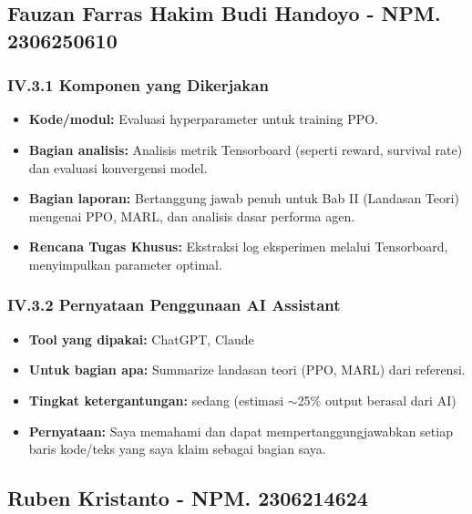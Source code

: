 \documentclass[12pt,a4paper]{article}
\begin{document}
\subsection{Fauzan Farras Hakim Budi Handoyo - NPM. 2306250610}

\subsubsection*{IV.3.1 Komponen yang Dikerjakan}
\begin{itemize}
    \item \textbf{Kode/modul:} Evaluasi hyperparameter untuk training PPO.
    \item \textbf{Bagian analisis:} Analisis metrik Tensorboard (seperti reward, survival rate) dan evaluasi konvergensi model.
    \item \textbf{Bagian laporan:} Bertanggung jawab penuh untuk Bab II (Landasan Teori) mengenai PPO, MARL, dan analisis dasar performa agen.
    \item \textbf{Rencana Tugas Khusus:} Ekstraksi log eksperimen melalui Tensorboard, menyimpulkan parameter optimal.
\end{itemize}

\subsubsection*{IV.3.2 Pernyataan Penggunaan AI Assistant}
\begin{itemize}
    \item \textbf{Tool yang dipakai:} ChatGPT, Claude
    \item \textbf{Untuk bagian apa:} Summarize landasan teori (PPO, MARL) dari referensi.
    \item \textbf{Tingkat ketergantungan:} sedang (estimasi $\sim$25\% output berasal dari AI)
    \item \textbf{Pernyataan:} Saya memahami dan dapat mempertanggungjawabkan setiap baris kode/teks yang saya klaim sebagai bagian saya.
\end{itemize}

\subsection{Ruben Kristanto - NPM. 2306214624}
\end{document}
